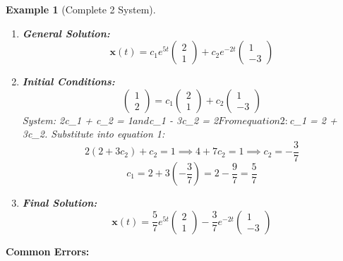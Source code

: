 \documentclass[12pt]{article}
\newtheorem{example}{Example}
\begin{document}
\begin{example}[Complete 2 System]
\begin{enumerate}
\item \textbf{General Solution:}
\[\mathbf{x}(t) = c_{1} e^{5t}\begin{pmatrix} 2 \\ 1 \end{pmatrix} + c_{2} e^{-2t}\begin{pmatrix} 1 \\ -3 \end{pmatrix}\]

\item \textbf{Initial Conditions:}
\[\begin{pmatrix} 1 \\ 2 \end{pmatrix} = c_{1}\begin{pmatrix} 2 \\ 1 \end{pmatrix} + c_{2}\begin{pmatrix} 1 \\ -3 \end{pmatrix}\]
System: 2c_{1} + c_{2} = 1$ and $c_{1} - 3c_{2} = 2$

From equation 2: $c_{1} = 2 + 3c_{2}. Substitute into equation 1:
\[2(2 + 3c_{2}) + c_{2} = 1 \implies 4 + 7c_{2} = 1 \implies c_{2} = -\frac{3}{7}\]
\[c_{1} = 2 + 3(-\frac{3}{7}) = 2 - \frac{9}{7} = \frac{5}{7}\]

\item \textbf{Final Solution:}
\[\mathbf{x}(t) = \frac{5}{7}e^{5t}\begin{pmatrix} 2 \\ 1 \end{pmatrix} - \frac{3}{7}e^{-2t}\begin{pmatrix} 1 \\ -3 \end{pmatrix}\]
\end{enumerate}
\end{example}

\begin{warning}
\textbf{Common Errors:}
\end{warning}
\end{document}
